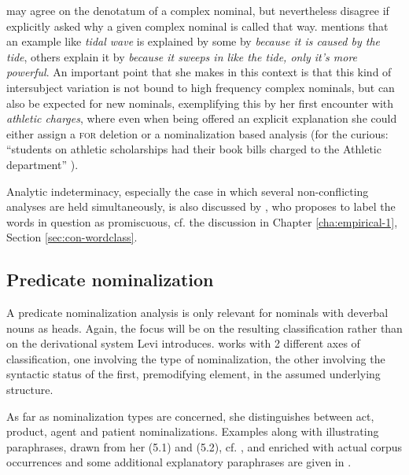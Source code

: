 may agree on the denotatum of a complex nominal, but nevertheless
disagree if explicitly asked why a given complex nominal is called that
way. \citet[265]{Levi:1978} mentions that an example like \emph{tidal
  wave} is explained by some by \emph{because it is caused by the
  tide}, others explain it by \emph{because it sweeps in
like the tide, only it's more powerful}. An important point
that she makes in this context is that this kind of intersubject variation is
not bound to high frequency complex nominals, but can also be expected for new
nominals, exemplifying this by her first encounter with \emph{athletic
  charges}, where even when being offered an explicit explanation she could either
assign a \textsc{for} deletion or a nominalization based analysis (for the
curious: ``students on athletic scholarships had their book bills
charged to the Athletic department'' \citealt[265]{Levi:1978}). %

Analytic indeterminacy, especially the case in which several
non-conflicting analyses are held simultaneously, is also discussed by
\citet[427--428]{Jackendoff:2010}, who proposes to label the words in
question as promiscuous, cf. the discussion in Chapter \ref{cha:empirical-1}, Section \ref{sec:con-wordclass}.

\subsection{Predicate nominalization}
\label{sec:levi_predicate_nominalization}

A predicate nominalization analysis is only relevant for nominals with
deverbal nouns as heads.  Again, the focus will be on the resulting
classification rather than on the derivational system Levi
introduces. \citet[167--174]{Levi:1978} works with 2 different axes
of classification, one involving the type of nominalization, the other
involving the syntactic status of the first, premodifying element, in
the assumed underlying structure.

As far as nominalization types are concerned, she distinguishes between act,
product, agent and patient nominalizations. Examples along with
illustrating paraphrases, drawn from her (5.1) and (5.2),
cf. \citet[168--169]{Levi:1978}, and enriched with actual corpus occurrences and some
additional explanatory paraphrases are given in \Next.

